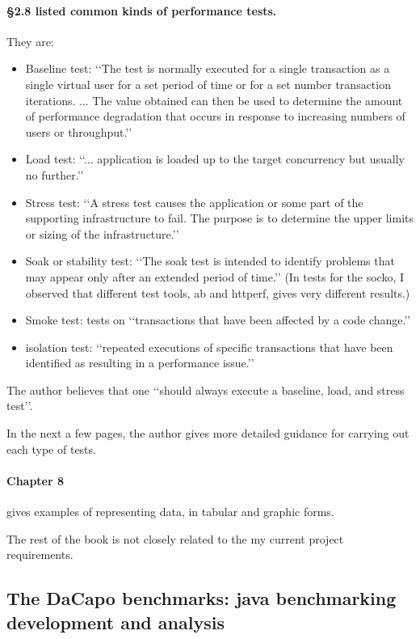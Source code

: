 \documentclass[12pt, a4paper, twoside]{article}
\begin{document}
\paragraph{\S2.8 listed common kinds of performance tests.}  They are:
\begin{itemize}
  \item Baseline test: \lq\lq{}The test is normally executed for a single transaction as a single virtual user for a set period of time or for a set number transaction iterations. ... The value obtained can then be used to determine the amount of performance degradation that occurs in response to increasing numbers of users or throughput.\rq\rq{}
  \item Load test: \lq\lq{}... application is loaded up to the target concurrency but usually no further.\rq\rq{}
  \item Stress test: \lq\lq{}A stress test causes the application or some part of the supporting infrastructure to fail.  The purpose is to determine the upper limits or sizing of the infrastructure.\rq\rq{}
  \item Soak or stability test: \lq\lq{}The soak test is intended to identify problems that may appear only after an extended period of time.\rq\rq{} (In tests for the  socko, I observed that different test tools, ab and httperf, gives very different results.)
  \item Smoke test: tests on \lq\lq{}transactions that have been affected by a code change.\rq\rq{}
  \item isolation test: \lq\lq{}repeated executions of specific transactions that have been identified as resulting in a performance issue.\rq\rq{}
\end{itemize}

The author believes that one \lq\lq{}should always execute a baseline, load, and stress test\rq\rq{}.

In the next a few pages, the author gives more detailed guidance for carrying out each type of tests.

\paragraph{Chapter 8} gives examples of representing data, in tabular and graphic forms.

The rest of the book is not closely related to the my current project requirements.


\subsection{The DaCapo benchmarks: java benchmarking development and analysis\cite{Blackburn2006}}
\end{document}
